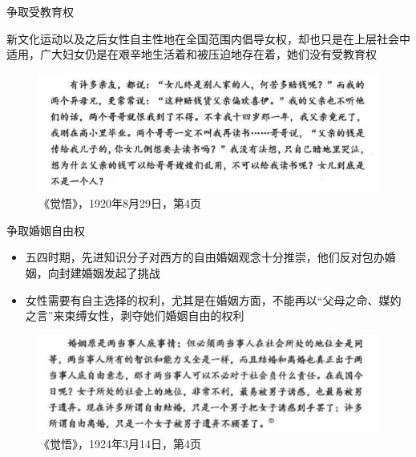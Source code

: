 \begin{frame}{争取受教育权}
    \begin{block}{}
        新文化运动以及之后女性自主性地在全国范围内倡导女权，却也只是在上层社会中适用，广大妇女仍是在艰辛地生活着和被压迫地存在着，她们没有受教育权
    \end{block}
    \begin{figure}
        \centering
        \includegraphics[width=\textwidth]{../docs/img/1-7.jpg}
        \caption{《觉悟》，1920年8月29日，第4页}
    \end{figure}
\end{frame}

\begin{frame}{争取婚姻自由权}
    \begin{block}{}
        \begin{itemize}
            \item 五四时期，先进知识分子对西方的自由婚姻观念十分推崇，他们反对包办婚姻，向封建婚姻发起了挑战
            \item 女性需要有自主选择的权利，尤其是在婚姻方面，不能再以“父母之命、媒妁之言”来束缚女性，剥夺她们婚姻自由的权利
        \end{itemize}
    \end{block}
    \begin{figure}
        \centering
        \includegraphics[width=\textwidth]{../docs/img/1-8.jpg}
        \caption{《觉悟》，1924年3月14日，第4页}
    \end{figure}
\end{frame}

